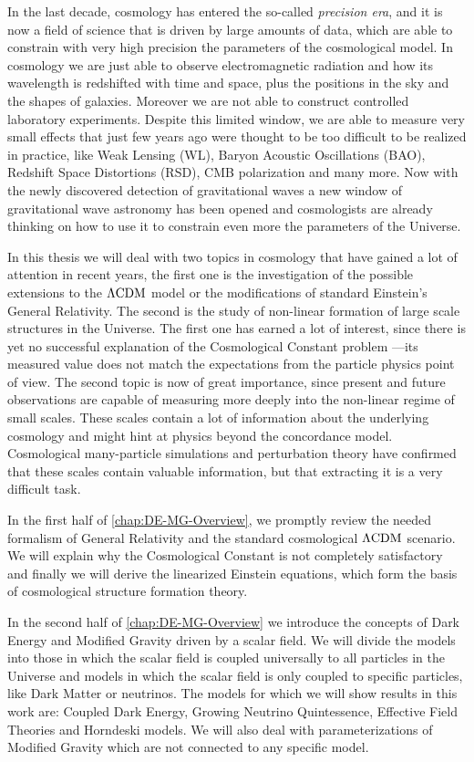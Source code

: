 In the last decade, cosmology has entered the so-called \emph{precision era}, and it is now a field of science that is driven by large amounts of data, which are able to constrain with very high precision the parameters of the cosmological model. In cosmology we are just able to observe electromagnetic radiation 
and how its wavelength is redshifted with time and space, plus the positions in the sky and the shapes of galaxies. Moreover we are not able to construct controlled laboratory experiments. Despite this limited window, we are able to measure very small effects that just few years ago were thought to be too difficult to be realized in practice, like Weak Lensing (WL), Baryon Acoustic Oscillations (BAO), Redshift Space Distortions (RSD), CMB polarization and many more.
Now with the newly discovered detection of gravitational waves a new window of gravitational wave astronomy has been opened and cosmologists are already thinking on how to use it to constrain even more the parameters of the Universe.

In this thesis we will deal with two topics in cosmology that have gained a lot of attention in recent years, the first one is the investigation of the possible extensions to the $\Lambda\mathrm{CDM}$ model or the modifications of standard Einstein's General Relativity. The second is the study of non-linear 
formation of large scale structures in the Universe. The first one has earned a lot of interest, since there is yet no successful explanation of the Cosmological Constant problem ---its measured value does not match the expectations from the particle physics point of view. 
The second topic is now of great importance, since present and future observations are capable of 
measuring more deeply into the non-linear regime of small scales. These scales contain a lot of information about the underlying cosmology and might hint at physics beyond the concordance model. Cosmological many-particle simulations and perturbation theory
have confirmed that these scales contain valuable information, 
but that extracting it is a very difficult task.

In the first half of \cref{chap:DE-MG-Overview}, 
we promptly review the needed formalism of General Relativity and
the standard cosmological $\Lambda\mathrm{CDM}$ scenario. We will explain why the Cosmological 
Constant is not completely satisfactory and finally we will derive the linearized
Einstein equations, which form the basis of cosmological structure formation theory.

In the second half of \cref{chap:DE-MG-Overview} we introduce the concepts of Dark Energy 
and Modified Gravity driven by a scalar field. We will divide the models into those in which the
scalar field is coupled universally to all particles in the Universe and models in which the scalar field is only coupled to specific particles, like Dark Matter or neutrinos. The models for which we will show results in this work are: Coupled Dark Energy, Growing Neutrino Quintessence, Effective Field Theories and
Horndeski models. We will also deal with parameterizations of Modified Gravity which are not connected
to any specific model.

